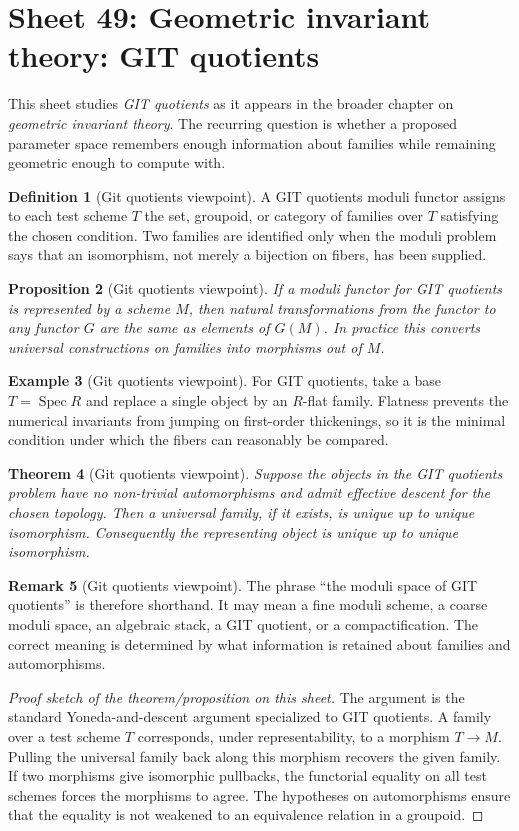 \documentclass[11pt]{amsart}
\newtheorem{theorem}{Theorem}[section]
\newtheorem{proposition}[theorem]{Proposition}
\theoremstyle{definition}
\newtheorem{definition}[theorem]{Definition}
\newtheorem{example}[theorem]{Example}
\newtheorem{remark}[theorem]{Remark}
\newcommand{\Spec}{\operatorname{Spec}}
\begin{document}
\section{Sheet 49: Geometric invariant theory: GIT quotients}
This sheet studies \emph{GIT quotients} as it appears in the broader chapter on \emph{geometric invariant theory}.  The recurring question is whether a proposed parameter space remembers enough information about families while remaining geometric enough to compute with.
\begin{definition}[Git quotients viewpoint]
A GIT quotients moduli functor assigns to each test scheme $T$ the set, groupoid, or category of families over $T$ satisfying the chosen condition.  Two families are identified only when the moduli problem says that an isomorphism, not merely a bijection on fibers, has been supplied.
\end{definition}
\begin{proposition}[Git quotients viewpoint]
If a moduli functor for GIT quotients is represented by a scheme $M$, then natural transformations from the functor to any functor $G$ are the same as elements of $G(M)$.  In practice this converts universal constructions on families into morphisms out of $M$.
\end{proposition}
\begin{example}[Git quotients viewpoint]
For GIT quotients, take a base $T=\Spec R$ and replace a single object by an $R$-flat family.  Flatness prevents the numerical invariants from jumping on first-order thickenings, so it is the minimal condition under which the fibers can reasonably be compared.
\end{example}
\begin{theorem}[Git quotients viewpoint]
Suppose the objects in the GIT quotients problem have no non-trivial automorphisms and admit effective descent for the chosen topology.  Then a universal family, if it exists, is unique up to unique isomorphism.  Consequently the representing object is unique up to unique isomorphism.
\end{theorem}
\begin{remark}[Git quotients viewpoint]
The phrase ``the moduli space of GIT quotients'' is therefore shorthand.  It may mean a fine moduli scheme, a coarse moduli space, an algebraic stack, a GIT quotient, or a compactification.  The correct meaning is determined by what information is retained about families and automorphisms.
\end{remark}
\begin{proof}[Proof sketch of the theorem/proposition on this sheet]
The argument is the standard Yoneda-and-descent argument specialized to GIT quotients.  A family over a test scheme $T$ corresponds, under representability, to a morphism $T\to M$.  Pulling the universal family back along this morphism recovers the given family.  If two morphisms give isomorphic pullbacks, the functorial equality on all test schemes forces the morphisms to agree.  The hypotheses on automorphisms ensure that the equality is not weakened to an equivalence relation in a groupoid.
\end{proof}
\end{document}
